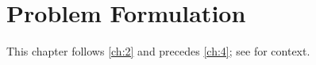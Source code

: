 \chapter{Problem Formulation}\label{ch:3}
\kant[9-10]

This chapter follows \cref{ch:2} and precedes \cref{ch:4}; see \citep{ch3-1,ch3-3} for context.
